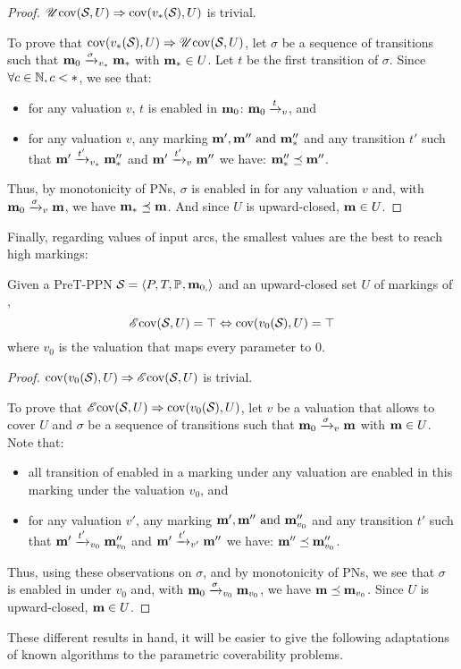 \begin{proof}
  $\UcovOp(\namePPN, U) \Rightarrow \covOp(v_*(\namePPN), U)$ is trivial.

  To prove that $\covOp(v_*(\namePPN), U) \Rightarrow \UcovOp(\namePPN, U)$, let $\sigma$ be a sequence of transitions such that $\mari \fire[v_*]{\sigma} \mar_*$ with $\mar_* \in U$.
  Let $t$ be the first transition of $\sigma$.
  Since $\forall c \in \naturals, c < *$, we see that:
  \begin{itemize}
    \item for any valuation $v$, $t$ is enabled in $\mari$: $\mari \fire[v]{t}$, and
    \item for any valuation $v$, any marking $\mar', \mar'' \text{ and } \mar''_*$ and any transition $t'$ such that $\mar' \fire[v_*]{t'} \mar''_*$ and $\mar' \fire[v]{t'} \mar''$ we have: $\mar''_* \preceq \mar''$.
  \end{itemize}

  Thus, by monotonicity of \acp{PN}, $\sigma$ is enabled in \mari for any valuation $v$ and, with $\mari \fire[v]{\sigma} \mar$, we have $\mar_* \preceq \mar$.
  And since $U$ is upward-closed, $\mar \in U$.
\end{proof}

Finally, regarding values of input arcs, the smallest values are the best to reach high markings:

\begin{theo}
  \label{theo:pre-e-zero-val}
  Given a PreT-\ac{PPN} $\defPPN$ and an upward-closed set $U$ of markings of \namePPN, \[\EcovOp(\namePPN, U) = \top \Leftrightarrow \covOp(v_0(\namePPN), U) = \top\] where $v_0$ is the valuation that maps every parameter to $0$.
\end{theo}

\begin{proof}
  $\covOp(v_0(\namePPN), U) \Rightarrow \EcovOp(\namePPN, U)$ is trivial.

  To prove that $\EcovOp(\namePPN, U) \Rightarrow \covOp(v_0(\namePPN), U)$, let $v$ be a valuation that allows to cover $U$ and $\sigma$ be a sequence of transitions such that $\mari \fire[v]{\sigma} \mar$ with $\mar \in U$.
  Note that:
  \begin{itemize}
    \item all transition of \namePPN enabled in a marking under any valuation are enabled in this marking under the valuation $v_0$, and
    \item for any valuation $v'$, any marking $\mar', \mar'' \text{ and } \mar''_{v_0}$ and any transition $t'$ such that $\mar' \fire[{v_0}]{t'} \mar''_{v_0}$ and $\mar' \fire[{v'}]{t'} \mar''$ we have: $\mar'' \preceq \mar''_{v_0}$.
  \end{itemize}

  Thus, using these observations on $\sigma$, and by monotonicity of \acp{PN}, we see that $\sigma$ is enabled in \mari under $v_0$ and, with $\mari \fire[{v_0}]{\sigma} \mar_{v_0}$, we have $\mar \preceq \mar_{v_0}$.
  Since $U$ is upward-closed, $\mar \in U$.
\end{proof}

These different results in hand, it will be easier to give the following adaptations of known algorithms to the parametric coverability problems.
